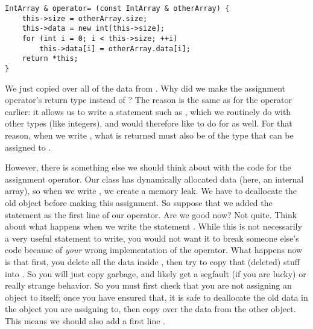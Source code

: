 \begin{verbatim}
IntArray & operator= (const IntArray & otherArray) {
    this->size = otherArray.size;
    this->data = new int[this->size];
    for (int i = 0; i < this->size; ++i)
        this->data[i] = otherArray.data[i];
    return *this;
}
\end{verbatim}

We just copied over all of the data from .
Why did we make the assignment operator's return type
 instead of ?
The reason is the same as for the \code{++} operator earlier:
it allows us to write a statement such as ,
which we routinely do with other types (like integers),
and would therefore like to do for  as well.
For that reason, when we write ,
what is returned must also be of the type that can be
assigned to .

However, there is something else we should think about with the code
for the assignment operator.
Our class  has dynamically allocated data
(here, an internal array), so when we write 
, we create a memory leak.
We have to deallocate the old  object before making this
assignment.
So suppose that we added the statement 
as the first line of our operator. Are we good now?
Not quite. Think about what happens when we write the statement
.
While this is not necessarily a very useful statement to write,
you would not want it to break someone else's code because
of \emph{your} wrong implementation of the operator. 
What happens now is that first, you delete all the data inside
, then try to copy that (deleted) stuff into .
So you will just copy garbage, and likely get a segfault
(if you are lucky) or really strange behavior.
So you must first check that you are not assigning an object to itself;
once you have ensured that, it is safe to deallocate the old data in
the object you are assigning to,
then copy over the data from the other object.
This means we should also add a first line
.

